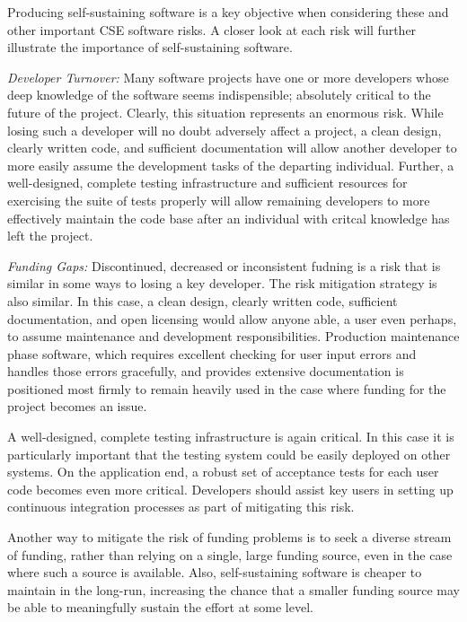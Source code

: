 \documentclass[11pt]{SANDreport}
\begin{document}
Producing self-sustaining software is a key objective when considering these
and other important CSE software risks.  A closer look at each risk will
further illustrate the importance of self-sustaining software. 


\textit{Developer Turnover:} Many software projects have one or
more developers whose deep knowledge of the software seems indispensible; 
absolutely critical to the future of the project.  Clearly, this situation
represents an enormous risk.  While losing such a developer will no doubt
adversely affect a project, a clean design,
clearly written code, and sufficient documentation
will allow another developer to more easily assume the development tasks
of the departing individual.  Further, a well-designed, complete testing
infrastructure and sufficient
resources for exercising the suite of tests properly will allow remaining
developers to more effectively maintain the code base after an individual
with critcal knowledge has left the project.

\textit{Funding Gaps:} Discontinued, decreased or inconsistent fudning is a
risk that is similar in some ways to losing a key developer.  The risk
mitigation strategy is also similar.  In this case, a clean design, clearly
written code, sufficient documentation, and open licensing would
allow anyone able, a user even perhaps, to assume maintenance and
development responsibilities.  Production maintenance phase
software, which requires excellent checking for user input errors and handles
those errors gracefully, and provides extensive documentation is positioned
most firmly to remain heavily used in the case where funding for the project
becomes an issue.

A well-designed, complete testing infrastructure is again critical.  In this
case it is particularly important that the testing system
could be easily deployed on other systems.  On the application end, a robust
set of acceptance tests for each user code becomes even more critical.
Developers should assist key users in setting up continuous integration
processes as part of mitigating this risk.

Another way to mitigate the risk of funding problems is to seek a diverse
stream of funding, rather than relying on a single, large funding source, even
in the case where such a source is available.  Also, self-sustaining software
is cheaper to maintain in the long-run, increasing the chance that a smaller
funding source may be able to meaningfully sustain the effort at some level.
\end{document}
